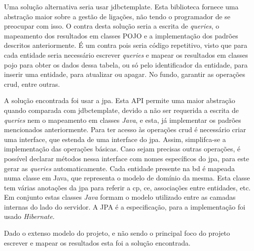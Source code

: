 Uma solução alternativa seria usar \acrfull{jdbctemplate}. Esta biblioteca fornece uma abstração maior sobre a gestão de ligações, não tendo o programador de se preocupar com isso. O contra desta solução seria a escrita de \textit{queries}, o mapeamento dos resultados em classes POJO e a implementação dos padrões descritos anteriormente. É um contra pois seria código repetitivo, visto que para cada entidade seria necessário escrever \textit{queries} e mapear os resultados em classes \acrshort{pojo} para obter os dados dessa tabela, ou só pelo identificador da entidade, para inserir uma entidade, para atualizar ou apagar. No fundo, garantir as operações \acrfull{crud}, entre outras. 

A solução encontrada foi usar a \acrfull{jpa}. Esta API permite uma maior abstração quando comparada com \acrshort{jdbctemplate}, devido a  não ser requerida a escrita de \textit{queries} nem o mapeamento em classes \textit{Java}, e esta, já implementar os padrões mencionados anteriormente. Para ter acesso às operações \acrshort{crud} é necessário criar uma interface, que estenda de uma interface do \acrshort{jpa}. Assim, simplifca-se a implementação das operações básicas. Caso sejam precisas outras operações, é possível declarar métodos nessa interface com nomes específicos do \acrshort{jpa}, para este gerar as \textit{queries} automaticamente.
Cada entidade presente na \acrshort{bd} é mapeada numa classe em Java, que representa o modelo de domínio da mesma. Esta classe tem várias anotações da \acrshort{jpa} para referir a \acrlong{cp}, \acrlong{ce}, associações entre entidades, etc. Em conjunto estas classes \textit{Java} formam o modelo utilizado entre as camadas internas do lado do servidor. A JPA é a especificação, para a implementação foi usado \textit{Hibernate}.

Dado o extenso modelo do projeto, e não sendo o principal foco do projeto escrever e mapear os resultados esta foi a solução encontrada.